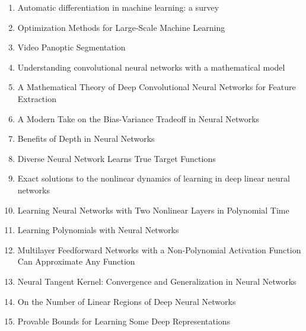 \documentclass[acmlarge]{acmart}
\begin{document}
\begin{enumerate}
	\item Automatic differentiation in machine learning: a survey \cite{Baydin2017AutomaticDI} 

	\item Optimization Methods for Large-Scale Machine Learning \cite{Bottou2018OptimizationMF} 

	\item Video Panoptic Segmentation \cite{Kim2020VideoPS} 

	\item Understanding convolutional neural networks with a mathematical model \cite{Kuo2016UnderstandingCN} 

	\item A Mathematical Theory of Deep Convolutional Neural Networks for Feature Extraction \cite{Wiatowski2018AMT} 

	\item A Modern Take on the Bias-Variance Tradeoff in Neural Networks \cite{Neal2018AMT} 

	\item Benefits of Depth in Neural Networks \cite{Telgarsky2016BenefitsOD} 

	\item Diverse Neural Network Learns True Target Functions \cite{Xie2017DiverseNN} 

	\item Exact solutions to the nonlinear dynamics of learning in deep linear neural networks \cite{Saxe2014ExactST} 

	\item Learning Neural Networks with Two Nonlinear Layers in Polynomial Time \cite{Goel2019LearningNN} 

	\item Learning Polynomials with Neural Networks \cite{Andoni2014LearningPW} 

	\item Multilayer Feedforward Networks with a Non-Polynomial Activation Function Can Approximate Any Function \cite{Leshno1993MultilayerFN} 

	\item Neural Tangent Kernel: Convergence and Generalization in Neural Networks \cite{Jacot2018NeuralTK} 

	\item On the Number of Linear Regions of Deep Neural Networks \cite{Montfar2014OnTN} 

	\item Provable Bounds for Learning Some Deep Representations \cite{Arora2014ProvableBF} 


\end{enumerate}
\end{document}

